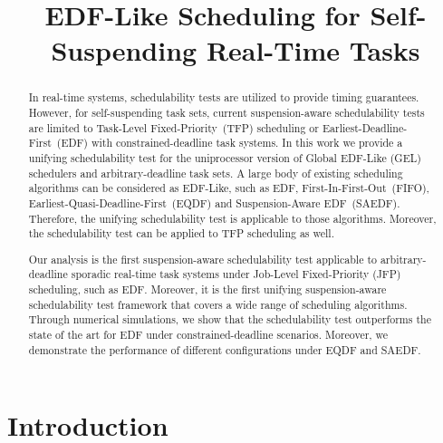 \documentclass[conference]{IEEEtran}
\theoremstyle{definition}
\theoremstyle{remark}
\begin{document}
	
	\title{EDF-Like Scheduling for Self-Suspending Real-Time Tasks}
	
	\author{
		\and
		\and
	}
	
	
	\maketitle

	\begin{abstract}
In real-time systems, schedulability tests are utilized to
provide timing guarantees.  However, for self-suspending task
sets, current suspension-aware schedulability tests are limited to Task-Level Fixed-Priority~(TFP) scheduling or Earliest-Deadline-First~(EDF) with
constrained-deadline task systems.  In this work 
we provide a unifying schedulability test for the uniprocessor version of Global EDF-Like (GEL) schedulers and arbitrary-deadline task sets.
A large body of
existing scheduling algorithms can be considered as EDF-Like, such as EDF,
First-In-First-Out~(FIFO), Earliest-Quasi-Deadline-First~(EQDF) and Suspension-Aware EDF~(SAEDF). Therefore, the unifying schedulability test is
applicable to those algorithms. 
Moreover, the schedulability test can be applied to TFP scheduling as well.

Our analysis is the first suspension-aware
schedulability test applicable to arbitrary-deadline sporadic
real-time task systems under Job-Level Fixed-Priority (JFP) scheduling, such as EDF.
Moreover, it is the first unifying suspension-aware
schedulability test framework that covers a wide range of
scheduling algorithms.
Through numerical simulations, we show
that the schedulability test outperforms the state of the art
for EDF under constrained-deadline scenarios. Moreover, we
demonstrate the performance of different configurations under
EQDF and SAEDF. 
	\end{abstract} 
	
	\section{Introduction}
	\label{sec:introduction}
\end{document}
